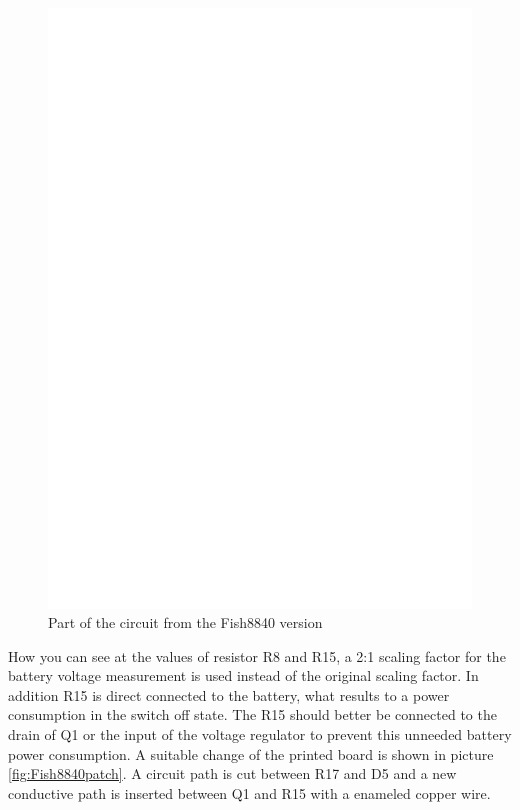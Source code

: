 \begin{figure}[H]
\centering
\includegraphics[width=12cm]{../FIG/Fish8840.eps}
\caption{Part of the circuit from the Fish8840 version}
\label{fig:Fish8840}
\end{figure}

How you can see at the values of resistor R8 and R15,
a 2:1 scaling factor for the battery voltage measurement is used instead of the original scaling factor.
In addition R15 is direct connected to the battery, what results to a power consumption in the switch off state.
The R15 should better be connected to the drain of Q1 or the input of the voltage regulator to prevent this
unneeded battery power consumption.
A suitable change of the printed board is shown in picture \ref{fig:Fish8840patch}.
A circuit path is cut between R17 and D5 and a new conductive path is inserted between Q1 and
R15 with a enameled copper wire.

